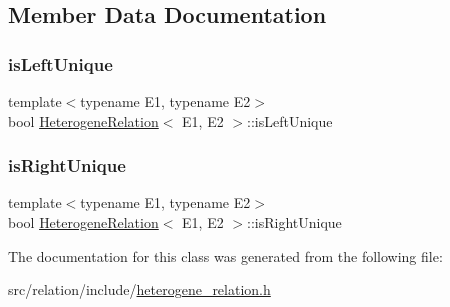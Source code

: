 \subsection{Member Data Documentation}
\mbox{\label{classHeterogeneRelation_a2c21f4a631adeb1dc9ff7b1affce6320}} 
\subsubsection{\texorpdfstring{is\+Left\+Unique}{isLeftUnique}}
{\footnotesize\ttfamily template$<$typename E1, typename E2$>$ \\
bool \hyperlink{classHeterogeneRelation}{Heterogene\+Relation}$<$ E1, E2 $>$\+::is\+Left\+Unique}

\mbox{\label{classHeterogeneRelation_a0250c13dffd96c0b880d26cd94a89d0c}} 
\subsubsection{\texorpdfstring{is\+Right\+Unique}{isRightUnique}}
{\footnotesize\ttfamily template$<$typename E1, typename E2$>$ \\
bool \hyperlink{classHeterogeneRelation}{Heterogene\+Relation}$<$ E1, E2 $>$\+::is\+Right\+Unique}



The documentation for this class was generated from the following file\+:\begin{DoxyCompactItemize}
\item 
src/relation/include/\hyperlink{heterogene__relation_8h}{heterogene\+\_\+relation.\+h}\end{DoxyCompactItemize}
